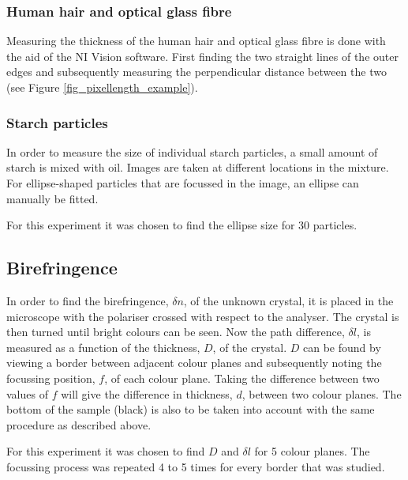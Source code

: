 \subsubsection{Human hair and optical glass fibre}

Measuring the thickness of the human hair and optical glass fibre is done with the aid of the NI Vision software. First finding the two straight lines of the outer edges and subsequently measuring the perpendicular distance between the two (see Figure \ref{fig_pixellength_example}). 

\subsubsection{Starch particles}

In order to measure the size of individual starch particles, a small amount of starch is mixed with oil. Images are taken at different locations in the mixture. For ellipse-shaped particles that are focussed in the image, an ellipse can manually be fitted.

For this experiment it was chosen to find the ellipse size for 30 particles.


\subsection{Birefringence}

In order to find the birefringence, $\delta n$, of the unknown crystal, it is placed in the microscope with the polariser crossed with respect to the analyser. The crystal is then turned until bright colours can be seen. Now the path difference, $\delta l$, is measured as a function of the thickness, $D$, of the crystal. $D$ can be found by viewing a border between adjacent colour planes and subsequently noting the focussing position, $f$, of each colour plane. Taking the difference between two values of $f$ will give the difference in thickness, $d$, between two colour planes. The bottom of the sample (black) is also to be taken into account with the same procedure as described above. 

For this experiment it was chosen to find $D$ and $\delta l$ for 5 colour planes. The focussing process was repeated 4 to 5 times for every border that was studied.









\begin{comment}
The Experimentele opstelling or Experimentele  methode (Experimental  set  up  or  Experimental method) chapter describes the experimental setup and the experimental methods used in sufficient detail such that a reader can judge the soundness and, in principle, may verify the conclusions of your research. Also,  this  chapter  should  be  informative  for  a  reader  who  wants  to  perform  similar  research.  Preferably  use clear sketches of the setup, rather than photographs. In this chapter you also describe the accuracywith which direct observables have been measured, and the accuracy of the important deduced quantities. Detailed accuracy calculations should be put in an Appendix
\end{comment}
